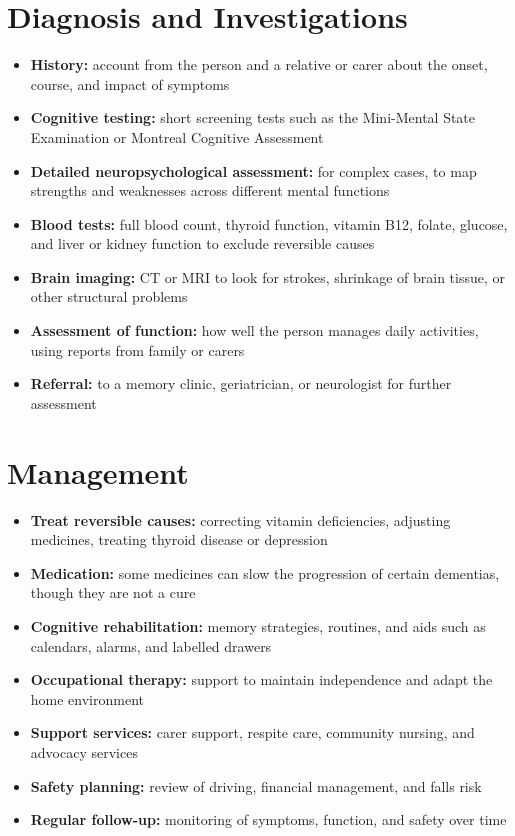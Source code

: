 \section*{Diagnosis and Investigations}
\begin{itemize}
    \item \textbf{History:} account from the person and a relative or carer about the onset, course, and impact of symptoms
    \item \textbf{Cognitive testing:} short screening tests such as the Mini-Mental State Examination or Montreal Cognitive Assessment
    \item \textbf{Detailed neuropsychological assessment:} for complex cases, to map strengths and weaknesses across different mental functions
    \item \textbf{Blood tests:} full blood count, thyroid function, vitamin B12, folate, glucose, and liver or kidney function to exclude reversible causes
    \item \textbf{Brain imaging:} CT or MRI to look for strokes, shrinkage of brain tissue, or other structural problems
    \item \textbf{Assessment of function:} how well the person manages daily activities, using reports from family or carers
    \item \textbf{Referral:} to a memory clinic, geriatrician, or neurologist for further assessment
\end{itemize}

\section*{Management}
\begin{itemize}
    \item \textbf{Treat reversible causes:} correcting vitamin deficiencies, adjusting medicines, treating thyroid disease or depression
    \item \textbf{Medication:} some medicines can slow the progression of certain dementias, though they are not a cure
    \item \textbf{Cognitive rehabilitation:} memory strategies, routines, and aids such as calendars, alarms, and labelled drawers
    \item \textbf{Occupational therapy:} support to maintain independence and adapt the home environment
    \item \textbf{Support services:} carer support, respite care, community nursing, and advocacy services
    \item \textbf{Safety planning:} review of driving, financial management, and falls risk
    \item \textbf{Regular follow-up:} monitoring of symptoms, function, and safety over time
\end{itemize}

